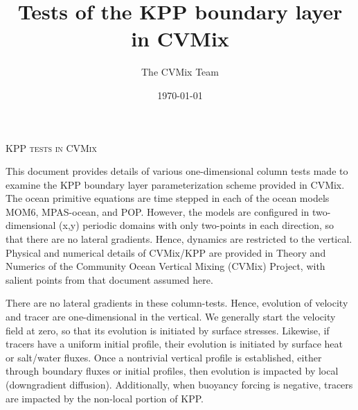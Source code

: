 \documentclass[fleqn,10pt]{book}
\title{\sc Tests of the KPP boundary layer in CVMix}
\date{\today}
\author[$\star$]{The CVMix Team}
\begin{document}
\maketitle 
\thispagestyle{empty}


\begin{center}
{\scshape \Large KPP tests in CVMix} 
\end{center}

This document provides details of various one-dimensional column tests
made to examine the KPP \citep{LargeKPP} boundary layer
parameterization scheme provided in CVMix.  The ocean primitive
equations are time stepped in each of the ocean models MOM6,
MPAS-ocean, and POP.  However, the models are configured in
two-dimensional (x,y) periodic domains with only two-points in each
direction, so that there are no lateral gradients.  Hence, dynamics
are restricted to the vertical.  Physical and numerical details of
CVMix/KPP are provided in {\sc Theory and Numerics of the Community
  Ocean Vertical Mixing (CVMix) Project}, with salient points from
that document assumed here.

There are no lateral gradients in these column-tests.  Hence,
evolution of velocity and tracer are one-dimensional in the vertical.
We generally start the velocity field at zero, so that its evolution
is initiated by surface stresses.  Likewise, if tracers have a uniform
initial profile, their evolution is initiated by surface heat or
salt/water fluxes.  Once a nontrivial vertical profile is established,
either through boundary fluxes or initial profiles, then evolution is
impacted by local (downgradient diffusion).  Additionally, when
buoyancy forcing is negative, tracers are impacted by the non-local
portion of KPP.


\dominitoc
\tableofcontents
\listoffigures






\newpage 


\gdef\rightmark{\scshape BIBLIOGRAPHY}

\end{document}
